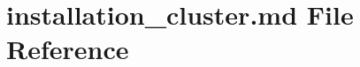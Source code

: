 \hypertarget{installation__cluster_8md}{}\section{installation\+\_\+cluster.\+md File Reference}
\label{installation__cluster_8md}
